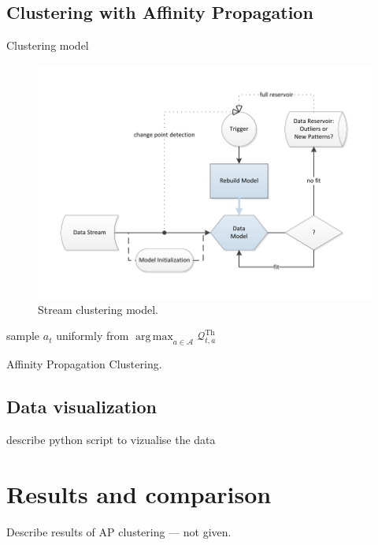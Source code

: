 \documentclass[11pt, letterpaper]{article}            %
\begin{document}
\subsection{Clustering with Affinity Propagation}
Clustering model~\citep{zhang2013data}\\
\begin{figure}[htbp]
	\centering
	\includegraphics[width=\textwidth]{./gfx/APC.pdf}
  \caption{Stream clustering model.\label{fig:APC}}
\end{figure}

\SetAlCapSkip{1em}
\LinesNumbered
\vspace{2cm}
\begin{algorithm}[h]
  sample $a_t$ uniformly from $\operatorname{arg\,max}_{a \in \mathscr{A}} 
\mathscr{Q}^\text{Th}_{t,a}$ \;
 \caption{Affinity Propagation Clustering.\label{alg:APC}}
\end{algorithm}
\vspace{2cm}

\subsection{Data visualization}
describe python script to vizualise the data\\


\section{Results and comparison}
Describe results of AP clustering --- not given.
\end{document}
